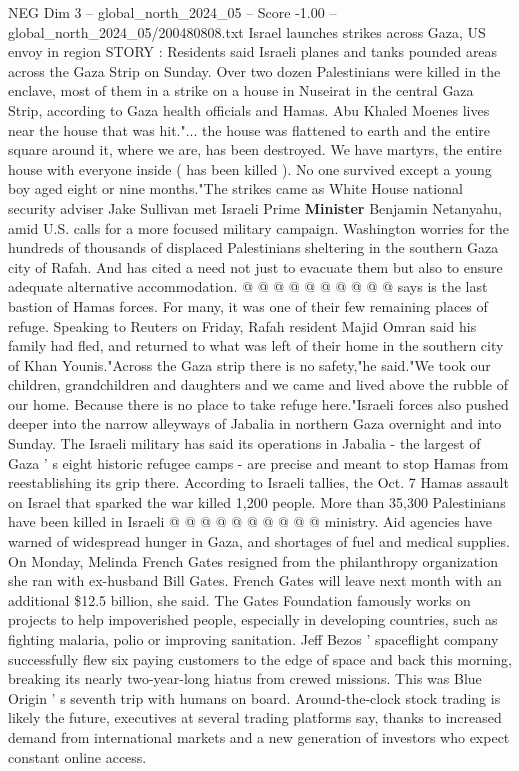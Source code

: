 \begin{textsample}{NEG Dim 3 – global\_north\_2024\_05 – Score -1.00 – global\_north\_2024\_05/200480808.txt}  \label{ex:f3_neg_446}
Israel launches strikes across Gaza, US envoy in region STORY : Residents said Israeli planes and tanks pounded areas across the Gaza Strip on Sunday.
Over two dozen Palestinians were killed in the enclave, most of them in a strike on a house in Nuseirat in the central Gaza Strip, according to Gaza health officials and Hamas.
Abu Khaled Moenes lives near the house that was hit."... the house was flattened to earth and the entire square around it, where we are, has been destroyed.
We have martyrs, the entire house with everyone inside ( has been killed ).
No one survived except a young boy aged eight or nine months."The strikes came as White House national security adviser Jake Sullivan met Israeli Prime \textbf{Minister} Benjamin Netanyahu, amid U.S. calls for a more focused military campaign.
Washington worries for the hundreds of thousands of displaced Palestinians sheltering in the southern Gaza city of Rafah.
And has cited a need not just to evacuate them but also to ensure adequate alternative accommodation. @ @ @ @ @ @ @ @ @ @ says is the last bastion of Hamas forces.
For many, it was one of their few remaining places of refuge.
Speaking to Reuters on Friday, Rafah resident Majid Omran said his family had fled, and returned to what was left of their home in the southern city of Khan Younis."Across the Gaza strip there is no safety,"he said."We took our children, grandchildren and daughters and we came and lived above the rubble of our home.
Because there is no place to take refuge here."Israeli forces also pushed deeper into the narrow alleyways of Jabalia in northern Gaza overnight and into Sunday.
The Israeli military has said its operations in Jabalia - the largest of Gaza ' s eight historic refugee camps - are precise and meant to stop Hamas from reestablishing its grip there.
According to Israeli tallies, the Oct. 7 Hamas assault on Israel that sparked the war killed 1,200 people.
More than 35,300 Palestinians have been killed in Israeli @ @ @ @ @ @ @ @ @ @ ministry.
Aid agencies have warned of widespread hunger in Gaza, and shortages of fuel and medical supplies.
On Monday, Melinda French Gates resigned from the philanthropy organization she ran with ex-husband Bill Gates.
French Gates will leave next month with an additional \$12.5 billion, she said.
The Gates Foundation famously works on projects to help impoverished people, especially in developing countries, such as fighting malaria, polio or improving sanitation.
Jeff Bezos ' spaceflight company successfully flew six paying customers to the edge of space and back this morning, breaking its nearly two-year-long hiatus from crewed missions.
This was Blue Origin ' s seventh trip with humans on board.
Around-the-clock stock trading is likely the future, executives at several trading platforms say, thanks to increased demand from international markets and a new generation of investors who expect constant online access.

\end{textsample}
